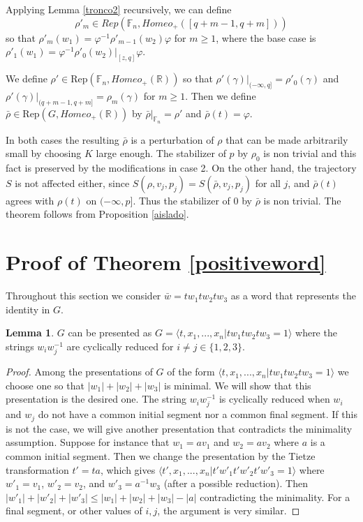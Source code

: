 \documentclass[12pt]{article}
\newcommand{\F}{\mathbb{F}}
\newcommand{\R}{\mathbb{R}}
\theoremstyle{definition}
\newtheorem{lem}[thm]{Lemma}
\newcommand{\vs}{\vspace{0.3cm}}
\begin{document}
\begin{itemize}
Applying Lemma \ref{tronco2} recursively, we can define $$\rho'_m\in Rep(\F_n,Homeo_{+}([q+m-1,q+m]))$$ so that $\rho'_m(w_1)=\varphi^{-1}\rho'_{m-1}(w_2)\varphi$ for $m\geq 1$, where the base case is $\rho'_{1}(w_1)=\varphi^{-1}\rho'_0(w_2)|_{[z,q]}\varphi$.

We define $\rho'\in\text{Rep}(\F_n,Homeo_{+}(\R))$ so that $\rho'(\gamma)|_{(-\infty,q]} = \rho'_0(\gamma)$ and \\ $\rho'(\gamma)|_{(q+m-1,q+m]}=\rho_m(\gamma)$ for $m\geq 1$. Then we define $\bar\rho\in\text{Rep}(G,Homeo_{+}(\R))$ by $\bar\rho|_{\F_n}=\rho'$ and $\bar\rho(t)=\varphi$.

\end{itemize}

In both cases the resulting $\bar\rho$ is a perturbation of $\rho$ that can be made arbitrarily small by choosing $K$ large enough. The stabilizer of $p$ by $\rho_0$ is non trivial and this fact is preserved by the modifications in case 2. On the other hand, the trajectory $S$ is not affected either, since $S(\rho,v_j,p_j)=S(\bar\rho,v_j,p_j)$ for all $j$, and $\bar\rho(t)$ agrees with $\rho(t)$ on $(-\infty,p]$. Thus the stabilizer of $0$ by $\bar\rho$ is non trivial. The theorem follows from Proposition \ref{aislado}. 




\section{Proof of Theorem \ref{positiveword}}

Throughout this section we consider $\bar w=tw_1tw_2tw_3$ as a word that represents the identity in $G$.

\begin{lem} \label{lasmagias} $G$ can be presented as $G=\langle t,x_1,...,x_n|tw_1tw_2tw_3=1\rangle$ where the strings $w_iw_j^{-1}$ are cyclically reduced for $i\neq j\in\{1,2,3\}$.
\end{lem}



\vs
\begin{proof} Among the presentations of $G$ of the form $\langle t,x_1,...,x_n|tw_1tw_2tw_3=1\rangle$ we choose one so that $|w_1|+|w_2|+|w_3|$ is minimal. We will show that this presentation is the desired one. 
The string $w_iw_j^{-1}$ is cyclically reduced when $w_i$ and $w_j$ do not have a common initial segment nor a common final segment. If this is not the case, we will give another presentation that contradicts the minimality assumption. Suppose for instance that $w_1=av_1$ and $w_2=av_2$ where $a$ is a common initial segment. Then we change the presentation by the Tietze transformation $t'=ta$, which gives $\langle t',x_1,...,x_n|t'w'_1t'w'_2t'w'_3=1\rangle$ where $w'_1=v_1$, $w'_2=v_2$, and $w'_3=a^{-1}w_3$ (after a possible reduction). Then $|w'_1|+|w'_2|+|w'_3| \leq |w_1|+|w_2|+|w_3| - |a|$ contradicting the minimality. For a final segment, or other values of $i,j$, the argument is very similar.
\end{proof}
\end{document}
